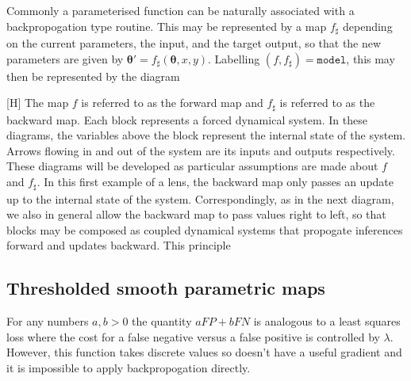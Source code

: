 \documentclass[10pt,a4paper]{article}
\begin{document}
Commonly a parameterised function can be naturally associated with a backpropogation type routine.
This may be represented by a map $f_\sharp$ depending on the current parameters, the input, and the target output, so that the new parameters are given by $\boldsymbol\theta'=f_\sharp(\boldsymbol\theta,x,y)$.
Labelling $(f,f_\sharp)=\texttt{model}$, this may then be represented by the diagram
\begin{figure}[H]
\end{figure}[H]
The map $f$ is referred to as the forward map and $f_\sharp$ is referred to as the backward map.
Each block represents a forced dynamical system.
In these diagrams, the variables above the block represent the internal state of the system.
Arrows flowing in and out of the system are its inputs and outputs respectively.
These diagrams will be developed as particular assumptions are made about $f$ and $f_\sharp$.
In this first example of a lens, the backward map only passes an update up to the internal state of the system.
Correspondingly, as in the next diagram, we also in general allow the backward map to pass values right to left, so that blocks may be composed as coupled dynamical systems that propogate inferences forward and updates backward.
This principle 
\subsection{Thresholded smooth parametric maps}
For any numbers $a,b>0$ the quantity $aFP+bFN$ is analogous to a least squares loss where the cost for a false negative versus a false positive is controlled by $\lambda$.
However, this function takes discrete values so doesn't have a useful gradient and it is impossible to apply backpropogation directly.
\end{document}
